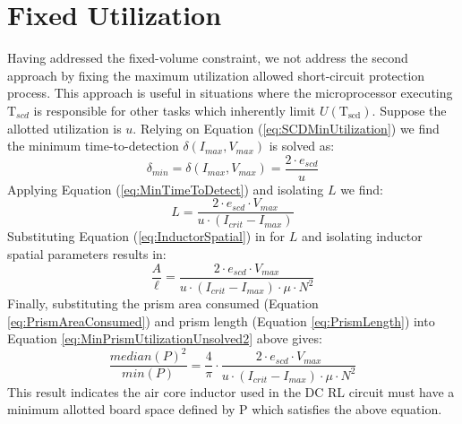 \documentclass[11pt,oneside]{report}
\begin{document}
    \section*{Fixed Utilization}
    Having addressed the fixed-volume constraint, we not address the second approach by fixing the maximum utilization allowed short-circuit protection process.
    This approach is useful in situations where the microprocessor executing $\mathrm{T}_{scd}$ is responsible for other tasks which inherently limit $U(\mathrm{T_{scd}})$. Suppose the allotted utilization is $u$. Relying on Equation (\ref{eq:SCDMinUtilization}) we find the minimum time-to-detection $\delta(I_{max},V_{max})$ is solved as:
    \begin{equation}\label{eq:MinTimeToDetectSpatial}
    \delta_{min} = \delta(I_{max},V_{max}) = \frac{2 \cdot e_{scd}}{u} \nonumber
    \end{equation}
    Applying Equation (\ref{eq:MinTimeToDetect}) and isolating $L$ we find:
    \begin{equation}\label{eq:InductorFixedUtilization}
    L = \frac{2 \cdot e_{scd} \cdot V_{max}}{u \cdot (I_{crit}-I_{max})} \nonumber
    \end{equation}
    Substituting Equation (\ref{eq:InductorSpatial}) in for $L$ 
    and isolating inductor spatial parameters results in:
    \begin{equation}\label{eq:MinPrismUtilizationUnsolved2}
    \frac{A}{\ell} = \frac{2 \cdot e_{scd} \cdot V_{max}}{u \cdot (I_{crit}-I_{max}) \cdot \mu \cdot N^{2}} \nonumber
    \end{equation}
    Finally, substituting the prism area consumed (Equation \ref{eq:PrismAreaConsumed}) and prism length (Equation \ref{eq:PrismLength}) into Equation \ref{eq:MinPrismUtilizationUnsolved2} above gives:
    \begin{equation}\label{eq:MinPrismUtilization}
    \frac{median(P)^{2}}{min(P)} = \frac{4}{\pi} \cdot \frac{ 2 \cdot e_{scd} \cdot V_{max}}{u \cdot (I_{crit}-I_{max}) \cdot \mu \cdot N^{2}}
    \end{equation}
    This result indicates the air core inductor used in the DC RL circuit must have a minimum allotted board space defined by P which satisfies the above equation.
    
\end{document}
